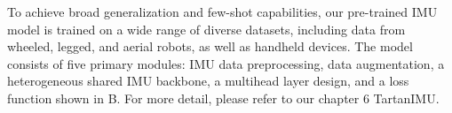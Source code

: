 To achieve broad generalization and few-shot capabilities, our pre-trained IMU model is trained on a wide range of diverse datasets, including data from wheeled, legged, and aerial robots, as well as handheld devices. The model consists of five primary modules: IMU data preprocessing, data augmentation, a heterogeneous shared IMU backbone, a multihead layer design, and a loss function shown in  B. For more detail, please refer to our chapter 6 TartanIMU.






